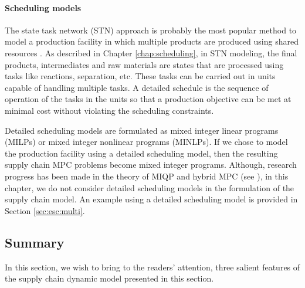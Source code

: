 \paragraph{Scheduling models}
The state task network (STN) approach
is probably the most popular method to model a production facility in
which multiple products are produced using shared resources
\citep{kondili:pantelides:sargent:1993,shah:pantelides:sargent:1993}.
As described in Chapter \ref{chap:scheduling}, in STN modeling, the
final products, intermediates and raw materials are 
states that are processed using tasks like reactions, separation,
etc. These tasks can be carried out in units capable of
handling multiple tasks. A detailed schedule is the sequence of
operation of the tasks in the units so that a production objective
can be met at minimal cost without violating the scheduling
constraints.

Detailed scheduling models are formulated as mixed integer linear
programs (MILPs) or mixed integer nonlinear programs (MINLPs). If we
chose to model the production facility using a detailed scheduling
model, then the resulting supply chain MPC problems become mixed
integer programs. Although, research progress
has been made in the theory of MIQP and hybrid MPC (see
\citep{bemporad:morari:1999}), in this chapter, we do not consider
detailed scheduling models in the formulation of the supply
chain model. An example using a detailed scheduling model is provided
in Section \ref{sec:esc:multi}.


 

\subsection{Summary}
In this section, we wish to bring to the readers' attention, three
salient features of the supply chain dynamic model presented in this
section.

